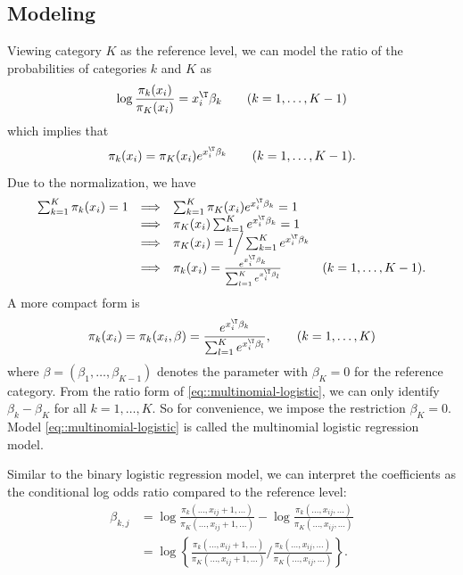 \subsection{Modeling}
Viewing category $K$ as the reference level, we can model the ratio of
the probabilities of categories $k$ and $K$ as
\[
\log\frac{\pi_{k}(x_{i})}{\pi_{K}(x_{i})}=x_{i}^{\T}\beta_{k}\qquad(k=1,\ldots,K-1)
\]
which implies that 
\[
\pi_{k}(x_{i})=\pi_{K}(x_{i})e^{x_{i}^{\T}\beta_{k}}\qquad(k=1,\ldots,K-1).
\]
Due to the normalization, we have
\[
\begin{array}{cclr}
\sum_{k=1}^{K}\pi_{k}(x_{i})=1 & \Longrightarrow& \sum_{k=1}^{K}\pi_{K}(x_{i})e^{x_{i}^{\T}\beta_{k}}=1\\
 & \Longrightarrow&\pi_{K}(x_{i})\sum_{k=1}^{K}e^{x_{i}^{\T}\beta_{k}}=1\\
 & \Longrightarrow&\pi_{K}(x_{i})=1\Big/\sum_{k=1}^{K}e^{x_{i}^{\T}\beta_{k}}\\
 & \Longrightarrow&\pi_{k}(x_{i})=\frac{e^{x_{i}^{\T}\beta_{k}}}{\sum_{ l =1}^{K}e^{x_{i}^{\T}\beta_{ l }}} & (k=1,\ldots,K-1).
\end{array}
\]
A more compact form is 
\begin{eqnarray}
\pi_{k}(x_{i})=\pi_{k}(x_{i},\beta)=\frac{e^{x_{i}^{\T}\beta_{k}}}{\sum_{ l =1}^{K}e^{x_{i}^{\T}\beta_{ l }}},\qquad(k=1,\ldots,K)
\label{eq::multinomial-logistic}
\end{eqnarray}
where $\beta=(\beta_{1},\ldots,\beta_{K-1})$ denotes the parameter
with $\beta_{K}=0$ for the reference category. From the ratio form of \eqref{eq::multinomial-logistic}, we can only identify $\beta_k - \beta_K$ for all $k= 1,\ldots, K$. So for convenience, we impose the restriction $\beta_{K}=0$. 
Model \eqref{eq::multinomial-logistic} is called the multinomial logistic regression model. 


Similar to the binary logistic regression model, we can interpret the coefficients as the conditional log odds ratio compared to the reference level:
\begin{align*}
\beta_{k,j} & =\log\frac{\pi_{k}( \ldots,x_{ij}+1,\ldots )}{\pi_{K}( \ldots,x_{ij}+1,\ldots )}-\log\frac{\pi_{k}( \ldots,x_{ij},\ldots )}{\pi_{K}( \ldots,x_{ij},\ldots )}\\
 & =\log\left\{ \frac{\pi_{k}( \ldots,x_{ij}+1,\ldots )}{\pi_{K}( \ldots,x_{ij}+1,\ldots )}\Big/\frac{\pi_{k}( \ldots,x_{ij},\ldots )}{\pi_{K}( \ldots,x_{ij},\ldots )}\right\} .
\end{align*}


